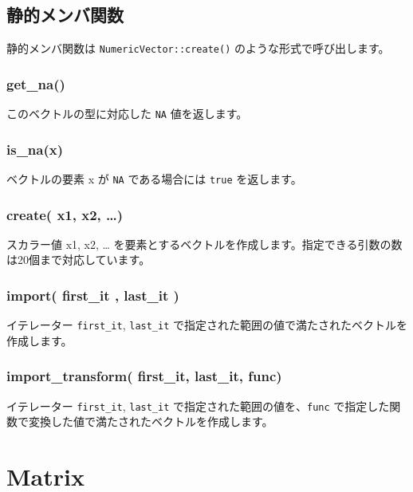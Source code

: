 \documentclass[]{book}
\begin{document}
\section{静的メンバ関数}

静的メンバ関数は \texttt{NumericVector::create()} のような形式で呼び出します。

\hypertarget{get_na}{%
\subsection{get\_na()}\label{get_na}}

このベクトルの型に対応した \texttt{NA} 値を返します。

\hypertarget{is_nax}{%
\subsection{is\_na(x)}\label{is_nax}}

ベクトルの要素 x が \texttt{NA} である場合には \texttt{true} を返します。

\hypertarget{create-x1-x2}{%
\subsection{create( x1, x2, \ldots{})}\label{create-x1-x2}}

スカラー値 x1, x2, \ldots{} を要素とするベクトルを作成します。指定できる引数の数は20個まで対応しています。

\hypertarget{import-first_it-last_it}{%
\subsection{import( first\_it , last\_it )}\label{import-first_it-last_it}}

イテレーター \texttt{first\_it}, \texttt{last\_it} で指定された範囲の値で満たされたベクトルを作成します。

\hypertarget{import_transform-first_it-last_it-func}{%
\subsection{import\_transform( first\_it, last\_it, func)}\label{import_transform-first_it-last_it-func}}

イテレーター \texttt{first\_it}, \texttt{last\_it} で指定された範囲の値を、\texttt{func} で指定した関数で変換した値で満たされたベクトルを作成します。

\hypertarget{matrix}{%
\chapter{Matrix}\label{matrix}}
\end{document}
